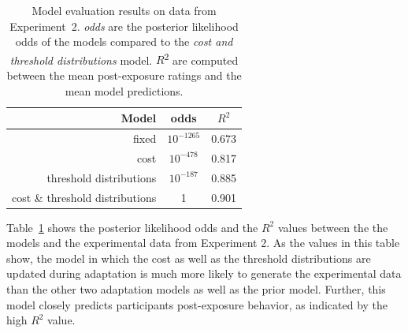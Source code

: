 \documentclass[man, floatsintext]{apa6}
\begin{document}

\begin{table}
\center
\begin{tabular}{r | c | c }
Model &   odds  &  $R^2$ \\ \midrule
fixed & $10^{-1265}$ &  0.673       \\
cost & $10^{-478}$ & 0.817     \\
threshold distributions & $10^{-187}$ &  0.885 \\
cost \& threshold distributions & 1 &  0.901 \\
\end{tabular}
\caption{Model evaluation results on data from Experiment~2.   \textit{odds} are the posterior likelihood odds of the models compared to the \textit{cost and threshold distributions} model.  $R$\textsuperscript{$2$} are computed between  the mean post-exposure ratings and the mean model predictions. \label{tbl:model-comparison-replication}}
\end{table}

Table~\ref{tbl:model-comparison-replication} shows 
 the posterior likelihood odds and the $R^2$ values between the the models and the experimental data from Experiment 2. 
 As the values in this table show, the model in which the cost as well as the threshold 
 distributions are updated during adaptation is much more likely to generate the experimental data than the other two adaptation models
 as well as the prior model. Further, this model closely predicts participants post-exposure behavior, as indicated by the high $R^2$ value. 
 
\end{document}
